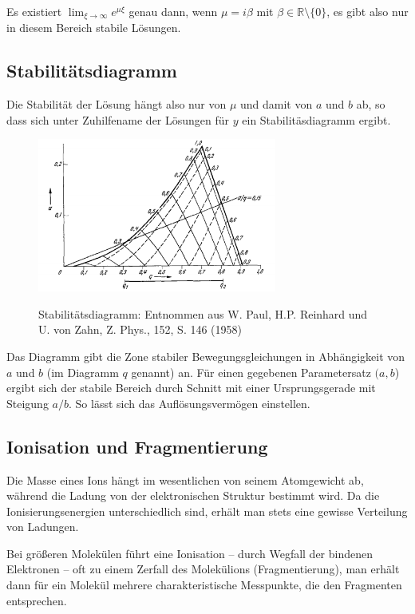 \documentclass[a4paper,german,12pt,smallheadings]{scrartcl}
\newcommand\invisiblesection[1]{%
    \refstepcounter{section}%
      \addcontentsline{toc}{section}{\protect\numberline{\thesection}#1}%
        \sectionmark{#1}}
\begin{document}
Es existiert $\lim_{\xi \to \infty} e^{\mu \xi}$ genau dann, wenn $\mu = i
\beta$ mit $\beta \in \mathbb{R} \setminus \{0\}$, es gibt also nur in diesem Bereich stabile
Lösungen.

\subsection{Stabilitätsdiagramm}

Die Stabilität der Lösung hängt also nur von $\mu$ und damit von $a$ und $b$
ab, so dass sich unter Zuhilfename der Lösungen für $y$ ein Stabilitäsdiagramm ergibt.

\begin{figure}[H]
  \includegraphics[width=0.7\textwidth]{stabidiag.png}
	\label{stabidiag}
  \caption{Stabilitätsdiagramm: Entnommen aus W. Paul, H.P. Reinhard und U. von Zahn, Z. Phys., 152,
S. 146 (1958)}
\end{figure}

Das Diagramm gibt die Zone stabiler Bewegungsgleichungen in Abhängigkeit von
$a$ und $b$ (im Diagramm $q$ genannt) an. Für einen gegebenen Parametersatz
$(a,b$) ergibt sich der stabile Bereich durch Schnitt mit einer Ursprungsgerade
mit Steigung $a/b$. So lässt sich das Auflösungsvermögen einstellen.

\subsection{Ionisation und Fragmentierung}

Die Masse eines Ions hängt im wesentlichen von seinem Atomgewicht ab, während
die Ladung von der elektronischen Struktur bestimmt wird. Da die
Ionisierungsenergien unterschiedlich sind, erhält man stets eine gewisse
Verteilung von Ladungen.

Bei größeren Molekülen führt eine Ionisation -- durch Wegfall der bindenen
Elektronen -- oft zu einem Zerfall des Molekülions (Fragmentierung), man erhält dann für ein
Molekül mehrere charakteristische Messpunkte, die den Fragmenten entsprechen.



%
%  
%
%
\end{document}

